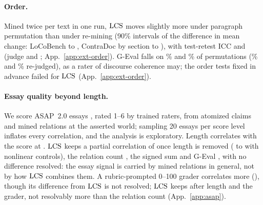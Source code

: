 \paragraph{Order.} Mined twice per text in one run, $\mathrm{LCS}$ moves slightly more under paragraph
permutation than under re-mining (90\% intervals of the difference in mean change: LoCoBench
\extLmEqLoGpt{} to \extLmEqHiGpt, ContraDoc by section \extSecEqLoGpt{} to \extSecEqHiGpt), with
test-retest ICC \extLmIccLcsAllGpt{} and \extSecIccLcsAllGpt{} (judge \extLmIccJudgeAll{} and
\extSecIccJudgeAll; App.~\ref{app:ext-order}). G-Eval falls on \extLmJudgePermDec\% and \extSecJudgePermDec\% of permutations (\extLmJudgeNoiseDec\%
and \extSecJudgeNoiseDec\% re-judged), as a rater of discourse coherence may; the order tests fixed
in advance failed for $\mathrm{LCS}$ (App.~\ref{app:ext-order}).

\paragraph{Essay quality beyond length.} We score \asapEssays{} ASAP~2.0 essays
\citep{crossley2025asap}, rated 1--6 by trained raters, from atomized claims and mined relations at the asserted world;
sampling 20 essays per score level inflates every correlation, and the analysis is exploratory.
Length correlates with the score at \asapRhoWords. $\mathrm{LCS}$ keeps a partial correlation of
\asapParLcsAsserted{} \asapCI{\asapParLcsAssertedLo}{\asapParLcsAssertedHi} once length is removed
(\asapRobCubic{} to \asapRobBinsSix{} with nonlinear controls), the relation count
\asapParRelations, the signed sum \asapParWsumAsserted{} and G-Eval \asapParJudgeGevalGptSixSol, with no
difference resolved: the essay signal is carried by mined relations in general, not by how
$\mathrm{LCS}$ combines them. A rubric-prompted 0--100 grader correlates more (\asapParJudgeRubricOneZeroZeroGptSixSol), though its
difference from $\mathrm{LCS}$ is not resolved; $\mathrm{LCS}$ keeps
\asapPwrhLcsAsserted{} after length and the grader, not resolvably more than the relation count
(App.~\ref{app:asap}).
